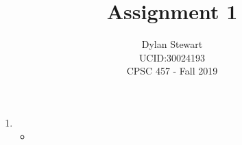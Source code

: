 \documentclass[10pt,letterpaper,titlepage]{article}
\author{Dylan Stewart\\UCID:30024193\\CPSC 457 - Fall 2019}
\title{Assignment 1}
\begin{document}
	\begin{titlepage}
		\maketitle
	\end{titlepage}
	\begin{enumerate}
		\item
			\begin{itemize}
				\item
			\end{itemize}
	\end{enumerate}
\end{document}
